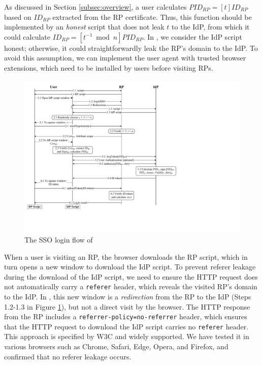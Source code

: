 As discussed in Section \ref{subsec:overview}, a user calculates $PID_{RP} = [t]ID_{RP}$ based on $ID_{RP}$ extracted from the RP certificate. Thus, this function should be implemented by an \emph{honest} script that does not leak $t$ to the IdP, from which it could calculate $ID_{RP} = [t^{-1}\bmod n]PID_{RP}$. In \usso, we consider the IdP script honest; otherwise, it could straightforwardly leak the RP's domain to the IdP.
To avoid this assumption, we can implement the user agent with trusted browser extensions, which need to be installed by users before visiting RPs.

\begin{figure}[htb]
  \centering
  \includegraphics[height=0.55\textheight]{fig/process-js.pdf}
  \caption{The SSO login flow of \usso}
  \label{fig:process}
\end{figure}

When a user is visiting an RP, the browser downloads the RP script, which in turn opens a new window to download the IdP script. To prevent referer leakage during the download of the IdP script, we need to ensure the HTTP request does not automatically carry a \verb+referer+ header, which reveals the visited RP's domain to the IdP. %
In \usso, this new window is a \emph{redirection} from the RP to the IdP (Steps 1.2-1.3 in Figure \ref{fig:process}), but not a direct visit by the browser.
The HTTP response from the RP includes a \verb+referrer-policy=no-referrer+ header, which ensures that the HTTP request to download the IdP script carries no \verb+referer+ header.
This approach is specified by W3C \cite{referer_policy} and widely supported. We have tested it in various browsers such as Chrome, Safari, Edge, Opera, and Firefox, and confirmed that no referer leakage occurs.




